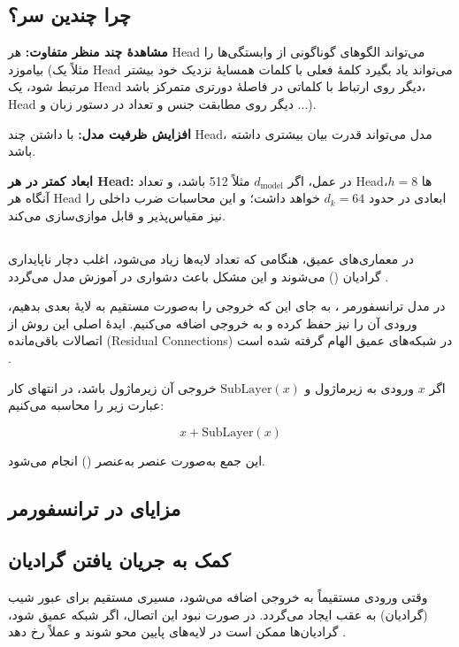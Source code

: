 \subsection*{چرا چندین سر؟}

\textbf{مشاهدهٔ چند منظر متفاوت:} هر Head می‌تواند الگوهای گوناگونی از وابستگی‌ها را بیاموزد (مثلاً یک Head می‌تواند یاد بگیرد کلمهٔ فعلی با کلمات همسایهٔ نزدیک خود بیشتر مرتبط شود، یک Head دیگر روی ارتباط با کلماتی در فاصلهٔ دورتری متمرکز باشد، Head دیگر روی مطابقت جنس و تعداد در دستور زبان و ...).

\textbf{افزایش ظرفیت مدل:} با داشتن چند Head، مدل می‌تواند قدرت بیان بیشتری داشته باشد.

\textbf{ابعاد کمتر در هر Head:} در عمل، اگر \( d_{\text{model}} \) مثلاً 512 باشد، و تعداد Headها \( h = 8 \)، آنگاه هر Head ابعادی در حدود \( d_k = 64 \) خواهد داشت؛ و این محاسبات ضرب داخلی را نیز مقیاس‌پذیر و قابل موازی‌سازی می‌کند.


\subsection{}
در معماری‌های عمیق، هنگامی که تعداد لایه‌ها زیاد می‌شود، اغلب دچار ناپایداری گرادیان () می‌شوند و این مشکل باعث دشواری در آموزش مدل می‌گردد \cite{hochreiter1997long,bengio1994learning}. 

در مدل ترانسفورمر \cite{vaswani2017attention}، به جای این که خروجی  را به‌صورت مستقیم به لایهٔ بعدی بدهیم، ورودی آن را نیز حفظ کرده و به خروجی اضافه می‌کنیم. ایدهٔ اصلی این روش از اتصالات باقی‌مانده (Residual Connections) در شبکه‌های عمیق الهام گرفته شده است \cite{he2016deep}.

اگر \( x \) ورودی به زیرماژول و \( \text{SubLayer}(x) \) خروجی آن زیرماژول باشد، در انتهای کار عبارت زیر را محاسبه می‌کنیم:

\begin{equation}
	x + \text{SubLayer}(x)
	\label{eq:sublayer}
\end{equation}

این جمع به‌صورت عنصر به‌عنصر () انجام می‌شود.

\subsection{مزایای  در ترانسفورمر}

\subsection*{کمک به جریان یافتن گرادیان}
وقتی ورودی مستقیماً به خروجی اضافه می‌شود، مسیری مستقیم برای عبور شیب (گرادیان) به عقب ایجاد می‌گردد.
در صورت نبود این اتصال، اگر شبکه عمیق شود، گرادیان‌ها ممکن است در لایه‌های پایین محو شوند و عملاً  رخ دهد \cite{hochreiter1997long,bengio1994learning}.

